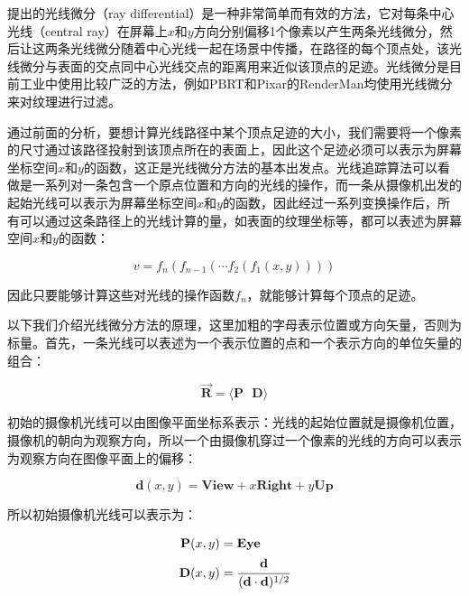 \cite{a:TracingRayDifferentials}提出的光线微分（ray differential）是一种非常简单而有效的方法，它对每条中心光线（central ray）在屏幕上$x$和$y$方向分别偏移1个像素以产生两条光线微分，然后让这两条光线微分随着中心光线一起在场景中传播，在路径的每个顶点处，该光线微分与表面的交点同中心光线交点的距离用来近似该顶点的足迹。光线微分是目前工业中使用比较广泛的方法，例如PBRT\cite{b:pbrt}和Pixar的RenderMan\cite{a:RayDifferentialsandMultiresolutionGeometryCachingforDistributionRayTracinginComplexScenes}均使用光线微分来对纹理进行过滤。

通过前面的分析，要想计算光线路径中某个顶点足迹的大小，我们需要将一个像素的尺寸通过该路径投射到该顶点所在的表面上，因此这个足迹必须可以表示为屏幕坐标空间$x$和$y$的函数，这正是光线微分方法的基本出发点。光线追踪算法可以看做是一系列对一条包含一个原点位置和方向的光线的操作，而一条从摄像机出发的起始光线可以表示为屏幕坐标空间$x$和$y$的函数，因此经过一系列变换操作后，所有可以通过这条路径上的光线计算的量，如表面的纹理坐标等，都可以表述为屏幕空间$x$和$y$的函数：

\begin{equation}
	v=f_n(f_{n-1}(\cdots f_2(f_1(x,y))))
\end{equation}

\noindent 因此只要能够计算这些对光线的操作函数$f_n$，就能够计算每个顶点的足迹。

以下我们介绍光线微分方法的原理，这里加粗的字母表示位置或方向矢量，否则为标量。首先，一条光线可以表述为一个表示位置的点和一个表示方向的单位矢量的组合：

\begin{equation}
	\overrightarrow{\mathbf{R}}=\langle \mathbf{P} \text{ }\mathbf{D}\rangle
\end{equation}

初始的摄像机光线可以由图像平面坐标系表示：光线的起始位置就是摄像机位置，摄像机的朝向为观察方向，所以一个由摄像机穿过一个像素的光线的方向可以表示为观察方向在图像平面上的偏移：

\begin{equation}
	\mathbf{d}(x,y)=\mathbf{View}+x\mathbf{Right}+y\mathbf{Up}
\end{equation}

\noindent 所以初始摄像机光线可以表示为：

\begin{equation}
	\begin{aligned}
		\mathbf{P}(x,y)&=\mathbf{Eye}\\
		\mathbf{D}(x,y)&= \cfrac{\mathbf{d}}{(\mathbf{d}\cdot \mathbf{d})^{1/2}}
	\end{aligned}
\end{equation}

